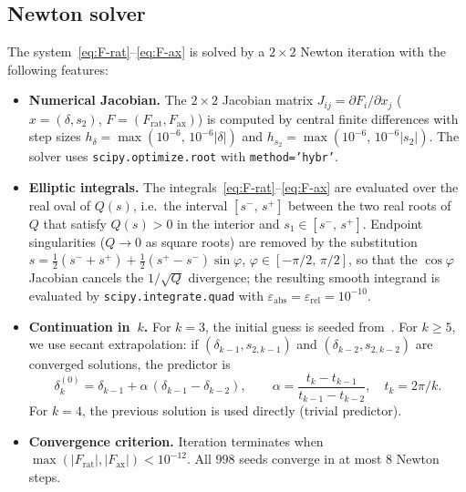 \documentclass[11pt,a4paper]{article}
\theoremstyle{plain}
\theoremstyle{definition}
\theoremstyle{remark}
\newcommand{\abs}[1]{\lvert #1 \rvert}
\begin{document}
\subsection{Newton solver}\label{sec:newton}
The system~\eqref{eq:F-rat}--\eqref{eq:F-ax} is solved by a
$2 \times 2$ Newton iteration with the following features:
\begin{itemize}[nosep]
\item \textbf{Numerical Jacobian.}
  The $2 \times 2$ Jacobian matrix
  $J_{ij} = \partial F_i/\partial x_j$
  ($x = (\delta, s_2)$, $F = (F_{\mathrm{rat}}, F_{\mathrm{ax}})$)
  is computed by central finite differences with step sizes
  $h_{\delta} = \max(10^{-6},\, 10^{-6}\abs{\delta})$
  and $h_{s_2} = \max(10^{-6},\, 10^{-6}\abs{s_2})$.
  The solver uses \texttt{scipy.optimize.root} with
  \texttt{method='hybr'}.
\item \textbf{Elliptic integrals.}
  The integrals~\eqref{eq:F-rat}--\eqref{eq:F-ax} are evaluated
  over the real oval of $Q(s)$, i.e.\ the interval
  $[s^-,\, s^+]$ between the two real roots of~$Q$ that satisfy
  $Q(s) > 0$ in the interior and $s_1 \in [s^-,\, s^+]$.
  Endpoint singularities ($Q \to 0$ as square roots) are removed
  by the substitution $s = \tfrac12(s^- + s^+)
  + \tfrac12(s^+ - s^-)\sin\varphi$, $\varphi \in [-\pi/2,\,\pi/2]$,
  so that the $\cos\varphi$ Jacobian cancels the $1/\sqrt{Q}$
  divergence; the resulting smooth integrand is evaluated by
  \texttt{scipy.integrate.quad} with
  $\varepsilon_{\mathrm{abs}} = \varepsilon_{\mathrm{rel}} = 10^{-10}$.
\item \textbf{Continuation in~$k$.}
  For $k = 3$, the initial guess is seeded from~\cite{BHS25}.
  For $k \geq 5$, we use secant extrapolation: if
  $(\delta_{k-1}, s_{2,k-1})$ and $(\delta_{k-2}, s_{2,k-2})$ are
  converged solutions, the predictor is
  \[
    \delta_{k}^{(0)} = \delta_{k-1}
      + \alpha\,(\delta_{k-1} - \delta_{k-2}),
    \qquad
    \alpha = \frac{t_k - t_{k-1}}{t_{k-1} - t_{k-2}},
    \quad t_k = 2\pi/k.
  \]
  For $k = 4$, the previous solution is used directly (trivial
  predictor).
\item \textbf{Convergence criterion.}
  Iteration terminates when
  $\max(\abs{F_{\mathrm{rat}}}, \abs{F_{\mathrm{ax}}}) < 10^{-12}$.
  All $998$ seeds converge in at most $8$ Newton steps.
\end{itemize}
\end{document}
